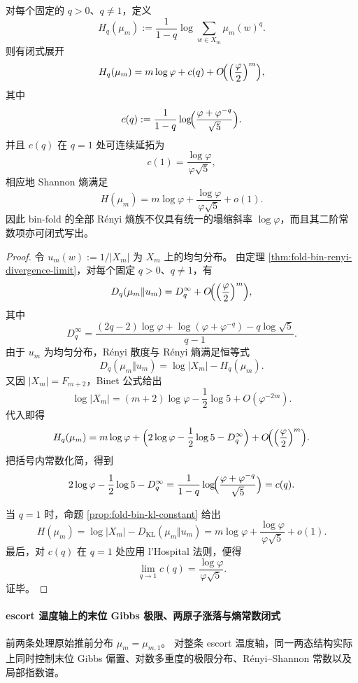 \begin{theorem}\label{thm:xi-fold-renyi-constant-spectrum-closed-form}
对每个固定的 \(q>0\)、\(q\neq 1\)，定义
\[
H_q(\mu_m):=\frac{1}{1-q}\log\sum_{w\in X_m}\mu_m(w)^q.
\]
则有闭式展开
\[
H_q(\mu_m)
=
m\log\varphi+c(q)+O\!\Bigl(\Bigl(\frac{\varphi}{2}\Bigr)^m\Bigr),
\]
其中
\[
c(q):=\frac{1}{1-q}\log\!\Bigl(\frac{\varphi+\varphi^{-q}}{\sqrt5}\Bigr).
\]
并且 \(c(q)\) 在 \(q=1\) 处可连续延拓为
\[
c(1)=\frac{\log\varphi}{\varphi\sqrt5},
\]
相应地 Shannon 熵满足
\[
H(\mu_m)=m\log\varphi+\frac{\log\varphi}{\varphi\sqrt5}+o(1).
\]
因此 bin-fold 的全部 Rényi 熵族不仅具有统一的塌缩斜率 \(\log\varphi\)，而且其二阶常数项亦可闭式写出。
\end{theorem}
\begin{proof}
令 \(u_m(w):=1/|X_m|\) 为 \(X_m\) 上的均匀分布。
由定理 \ref{thm:fold-bin-renyi-divergence-limit}，对每个固定 \(q>0\)、\(q\neq 1\)，有
\[
D_q(\mu_m\Vert u_m)=D_q^\infty+O\!\Bigl(\Bigl(\frac{\varphi}{2}\Bigr)^m\Bigr),
\]
其中
\[
D_q^\infty
=
\frac{(2q-2)\log\varphi+\log(\varphi+\varphi^{-q})-q\log\sqrt5}{q-1}.
\]
由于 \(u_m\) 为均匀分布，Rényi 散度与 Rényi 熵满足恒等式
\[
D_q(\mu_m\Vert u_m)=\log|X_m|-H_q(\mu_m).
\]
又因 \(|X_m|=F_{m+2}\)，Binet 公式给出
\[
\log|X_m|=(m+2)\log\varphi-\frac12\log 5+O(\varphi^{-2m}).
\]
代入即得
\[
H_q(\mu_m)
=
m\log\varphi+
\Bigl(2\log\varphi-\frac12\log 5-D_q^\infty\Bigr)
+O\!\Bigl(\Bigl(\frac{\varphi}{2}\Bigr)^m\Bigr).
\]
把括号内常数化简，得到
\[
2\log\varphi-\frac12\log 5-D_q^\infty
=
\frac{1}{1-q}\log\!\Bigl(\frac{\varphi+\varphi^{-q}}{\sqrt5}\Bigr)
=c(q).
\]

当 \(q=1\) 时，命题 \ref{prop:fold-bin-kl-constant} 给出
\[
H(\mu_m)=\log|X_m|-D_{\mathrm{KL}}(\mu_m\Vert u_m)
=m\log\varphi+\frac{\log\varphi}{\varphi\sqrt5}+o(1).
\]
最后，对 \(c(q)\) 在 \(q=1\) 处应用 l'Hospital 法则，便得
\[
\lim_{q\to 1}c(q)=\frac{\log\varphi}{\varphi\sqrt5}.
\]
证毕。
\end{proof}

\paragraph{escort 温度轴上的末位 Gibbs 极限、两原子涨落与熵常数闭式}
前两条处理原始推前分布 \(\mu_m=\mu_{m,1}\)。
对整条 escort 温度轴，同一两态结构实际上同时控制末位 Gibbs 偏置、对数多重度的极限分布、Rényi--Shannon 常数以及局部指数谱。

